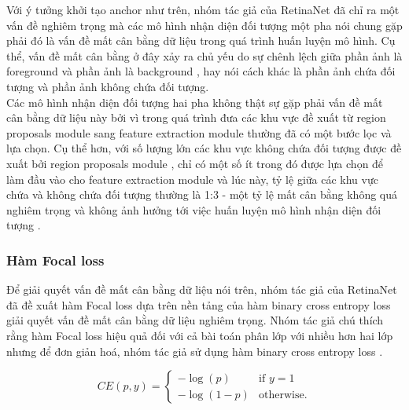 {    \noindent
    Với ý tưởng khởi tạo anchor  như trên, nhóm tác giả của RetinaNet  đã chỉ ra một vấn đề nghiêm trọng mà các mô hình nhận diện đối tượng  một pha  nói chung gặp phải đó là vấn đề mất cân bằng dữ liệu  trong quá trình huấn luyện mô hình.
    Cụ thể, vấn đề mất cân bằng ở đây xảy ra chủ yếu do sự chênh lệch giữa phần ảnh là foreground  và phần ảnh là background , hay nói cách khác là phần ảnh chứa đối tượng và phần ảnh không chứa đối tượng. \\
    Các mô hình nhận diện đối tượng  hai pha  không thật sự gặp phải vấn đề mất cân bằng dữ liệu  này bởi vì trong quá trình đưa các khu vực đề xuất từ region proposals module  sang feature extraction module  thường đã có một bước lọc và lựa chọn.
    Cụ thể hơn, với số lượng lớn các khu vực không chứa đối tượng được đề xuất bởi region proposals module , chỉ có một số ít trong đó được lựa chọn để làm đầu vào cho feature extraction module  và lúc này, tỷ lệ giữa các khu vực chứa và không chứa đối tượng thường là 1:3 - một tỷ lệ mất cân bằng không quá nghiêm trọng và không ảnh hưởng tới việc huấn luyện mô hình nhận diện đối tượng .

    \subsubsection{Hàm Focal loss}
    Để giải quyết vấn đề mất cân bằng dữ liệu  nói trên, nhóm tác giả của RetinaNet  đã đề xuất hàm Focal loss  dựa trên nền tảng của hàm binary cross entropy loss  giải quyết vấn đề mất cân bằng dữ liệu  nghiêm trọng.
    Nhóm tác giả chú thích rằng hàm Focal loss  hiệu quả đối với cả bài toán phân lớp với nhiều hơn hai lớp nhưng để đơn giản hoá, nhóm tác giả sử dụng hàm binary cross entropy loss .

    \begin{equation}
        \label{eq:bce}
        CE(p,y) = 
        \begin{cases}
            -\log(p) &\text{if $y = 1$} \\
            -\log (1 - p) &\text{otherwise.}
        \end{cases}
    \end{equation}

}
